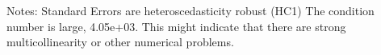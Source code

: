 Notes: \newline
 [1] Standard Errors are heteroscedasticity robust (HC1) \newline
 [2] The condition number is large, 4.05e+03. This might indicate that there are \newline
 strong multicollinearity or other numerical problems.